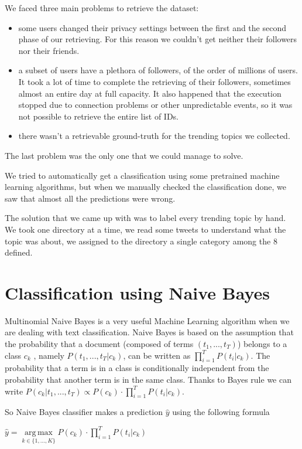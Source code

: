 \documentclass[journal,11pt]{vgtc}
\DeclareMathOperator*{\argmax}{arg\,max}
\begin{document}
We faced three main problems to retrieve the dataset:
\begin{itemize}
  \item some users changed their privacy settings between the first and the second phase
  of our retrieving. For this reason we couldn't get neither their followers nor their friends.
  \item a subset of users have a plethora of followers, of the order of millions of users.
  It took a lot of time to complete the retrieving of their followers, sometimes almost an
  entire day at full capacity.
  It also happened that the execution stopped due to connection problems or other unpredictable events,
  so it was not possible to retrieve the entire list of IDs.
  \item there wasn't a retrievable ground-truth for the trending topics we collected.
\end{itemize}

The last problem was the only one that we could manage to solve.

We tried to automatically get a classification using some pretrained machine learning algorithms, but when we
manually checked the classification done, we saw that almost all the predictions were wrong.

The solution that we came up with was to label every trending topic by hand.
We took one directory at a time, we read some tweets to understand what the topic was about,
we assigned to the directory a single category among the 8 defined.

\section{Classification using Naive Bayes}
Multinomial Naive Bayes is a very useful Machine Learning algorithm when we are dealing with
text classification.
Naive Bayes is based on the assumption that the probability that a document (composed of terms $(t_1,...,t_T)$) belongs to a class $c_k$
, namely $P(t_1, ..., t_T | c_k) $, can be written as $\prod\limits_{i=1}^{T}P(t_i|c_k)$.
The probability that a term is in a class is conditionally independent from the probability that
 another term is in the same class.
 Thanks to Bayes rule we can write $P(c_k | t_1, ..., t_T) \propto P(c_k) \cdot \prod\limits_{i=1}^{T}P(t_i|c_k)$.

 So Naive Bayes classifier makes a prediction $\hat{y}$ using the following formula

\begin{center}
$\hat{y} = \argmax\limits_{k \in \{1, ..., K \}} P(c_k) \cdot \prod\limits_{i = 1}^{T} P(t_i | c_k)$
\end{center}
\end{document}
